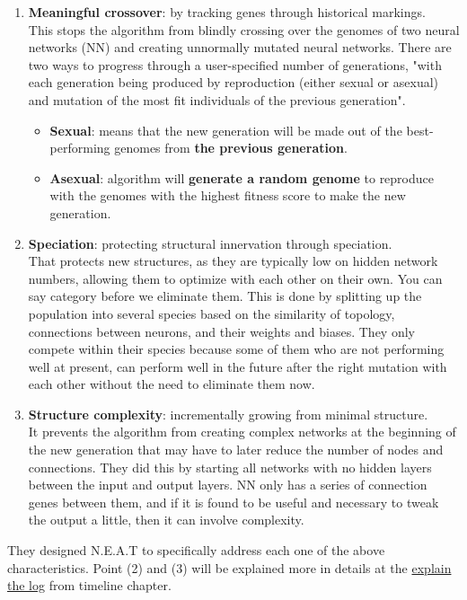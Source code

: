 \begin{enumerate} \label{list:3tweanns}
	\item \textbf{Meaningful crossover}: by tracking genes through historical markings.\\
	This stops the algorithm from blindly crossing over the genomes of two neural networks (NN) and creating unnormally mutated neural networks. There are two ways to progress through a user-specified number of generations, "with each generation being produced by reproduction (either sexual or asexual) and mutation of the most fit individuals of the previous generation".
	\begin{itemize}
		\item \textbf{Sexual}: means that the new generation will be made out of the best-performing genomes from \textbf{the previous generation}.
		\item \textbf{Asexual}: algorithm will \textbf{generate a random genome} to reproduce with the genomes with the highest fitness score to make the new generation.
	\end{itemize}
	
	\item \textbf{Speciation}: protecting structural innervation through speciation.\\
	That protects new structures, as they are typically low on hidden network numbers, allowing them to optimize with each other on their own. You can say category before we eliminate them. This is done by splitting up the population into several species based on the similarity of topology, connections between neurons, and their weights and biases. They only compete within their species because some of them who are not performing well at present, can perform well in the future after the right mutation with each other without the need to eliminate them now.
	\item \textbf{Structure complexity}: incrementally growing from minimal structure.\\
It prevents the algorithm from creating complex networks at the beginning of the new generation that may have to later reduce the number of nodes and connections. They did this by starting all networks with no hidden layers between the input and output layers. NN only has a series of connection genes between them, and if it is found to be useful and necessary to tweak the output a little, then it can involve complexity.
\end{enumerate}

They designed N.E.A.T to specifically address each one of the above characteristics. Point (2) and (3) will be explained more in details at the \hyperref[sec:explain-the-log]{explain the log} from timeline chapter.



